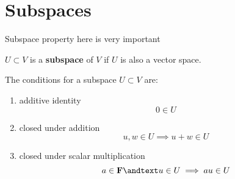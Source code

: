 \section{Subspaces}
\setcounter{exercise}{0}

Subspace property here is very important

\begin{definition}
  $U \subset V$ is a \textbf{subspace} of $V$ if $U$ is also a vector space.

  The conditions for a subspace $U \subset V$ are:
  \begin{enumerate}
    \item additive identity
          \begin{equation*}
            0 \in U
          \end{equation*}
    \item closed under addition
          \begin{equation*}
            u, w \in U \implies u + w \in U
          \end{equation*}
    \item closed under scalar multiplication
          \begin{equation*}
            a \in \mathbf{F} \andtext u \in U \implies au \in U
          \end{equation*}
  \end{enumerate}
\end{definition}



\setcounter{exercise}{14}



